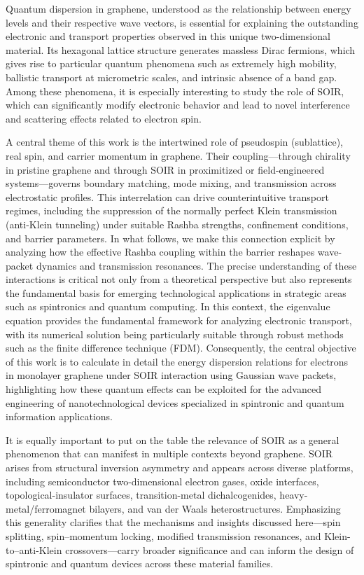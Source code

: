 Quantum dispersion in graphene, understood as the relationship between energy levels and their respective wave vectors, is essential for explaining the outstanding electronic and transport properties observed in this unique two-dimensional material.
Its hexagonal lattice structure generates massless Dirac fermions, which gives rise to particular quantum phenomena such as extremely high mobility, ballistic transport at micrometric scales, and intrinsic absence of a band gap\cite{Geimk2007}.
Among these phenomena, it is especially interesting to study the role of SOIR, which can significantly modify electronic behavior and lead to novel interference and scattering effects related to electron spin.

A central theme of this work is the intertwined role of pseudospin (sublattice), real spin, and carrier momentum in graphene.
Their coupling—through chirality in pristine graphene and through SOIR in proximitized or field-engineered systems—governs boundary matching, mode mixing, and transmission across electrostatic profiles.
This interrelation can drive counterintuitive transport regimes, including the suppression of the normally perfect Klein transmission (anti-Klein tunneling) under suitable Rashba strengths, confinement conditions, and barrier parameters\cite{Young2009, DellAnnaJPhysCondMatt2018}.
In what follows, we make this connection explicit by analyzing how the effective Rashba coupling within the barrier reshapes wave-packet dynamics and transmission resonances.
The precise understanding of these interactions is critical not only from a theoretical perspective but also represents the fundamental basis for emerging technological applications in strategic areas such as spintronics and quantum computing\cite{WeizheMaterials2017, AvsarNatCommun2014, LiuNano2023}.
In this context, the eigenvalue equation provides the fundamental framework for analyzing electronic transport, with its numerical solution being particularly suitable through robust methods such as the finite difference technique (FDM).
Consequently, the central objective of this work is to calculate in detail the energy dispersion relations for electrons in monolayer graphene under SOIR interaction using Gaussian wave packets, highlighting how these quantum effects can be exploited for the advanced engineering of nanotechnological devices specialized in spintronic and quantum information applications.

It is equally important to put on the table the relevance of SOIR as a general phenomenon that can manifest in multiple contexts beyond graphene.
SOIR arises from structural inversion asymmetry and appears across diverse platforms, including semiconductor two-dimensional electron gases, oxide interfaces, topological-insulator surfaces, transition-metal dichalcogenides, heavy-metal/ferromagnet bilayers, and van der Waals heterostructures.
Emphasizing this generality clarifies that the mechanisms and insights discussed here—spin splitting, spin–momentum locking, modified transmission resonances, and Klein-to–anti-Klein crossovers—carry broader significance and can inform the design of spintronic and quantum devices across these material families.

